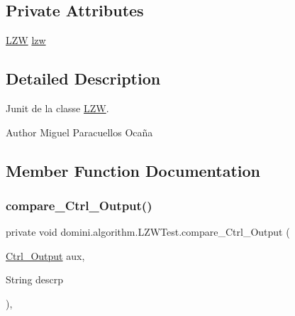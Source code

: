\subsection*{Private Attributes}
\begin{DoxyCompactItemize}
\item 
\hyperlink{classdomini_1_1algorithm_1_1LZW}{L\+ZW} \hyperlink{classdomini_1_1algorithm_1_1LZWTest_a591c1bb9b927631d0e60a2853e502d20}{lzw}
\end{DoxyCompactItemize}


\subsection{Detailed Description}
Junit de la classe \hyperlink{classdomini_1_1algorithm_1_1LZW}{L\+ZW}. 

\begin{DoxyAuthor}{Author}
Miguel Paracuellos Ocaña 
\end{DoxyAuthor}


\subsection{Member Function Documentation}
\mbox{\label{classdomini_1_1algorithm_1_1LZWTest_a8b2d8aee85d0eb1fdf9bd38f48524968}} 
\subsubsection{\texorpdfstring{compare\+\_\+\+Ctrl\+\_\+\+Output()}{compare\_Ctrl\_Output()}}
{\footnotesize\ttfamily private void domini.\+algorithm.\+L\+Z\+W\+Test.\+compare\+\_\+\+Ctrl\+\_\+\+Output (\begin{DoxyParamCaption}\item[{\hyperlink{classpersistencia_1_1output_1_1Ctrl__Output}{Ctrl\+\_\+\+Output}}]{aux,  }\item[{String}]{descrp }\end{DoxyParamCaption})\hspace{0.3cm}{\ttfamily [inline]}, {\ttfamily [private]}}




